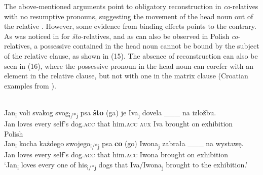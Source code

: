 \documentclass[output=paper]{langsci/langscibook}
\begin{document}
\ea%
    \label{ex:leska:14}
    \z
\z

The above-mentioned arguments point to obligatory reconstruction in \textit{co}-rel\-a\-tives with no resumptive pronouns, suggesting the movement of the head noun out of the relative \citep{Åfarli1994,Bhatt2002,Bianchi1999,Brame1968,Vries2002,Hornstein2000,Kayne1994,Safir1999,Schachter1973,Vergnaud1974,Zwart2000}. However, some evidence from binding effects points to the contrary. As was noticed in \citet{Gračanin-Yuksek2013} for  \textit{što}{}-relatives, and as can also be observed in Polish \textit{co}{}-relatives, a possessive  contained in the head noun cannot be bound by the subject of the relative clause, as shown in (15). The absence of reconstruction can also be seen in (16), where the possessive pronoun in the head noun can corefer with an element in the relative clause, but not with one in the matrix clause (Croatian examples from \citealt{Gračanin-Yuksek2013}).

\ea%
    \label{ex:leska:15}
    \ea    {}\\
      \gll Jan\textsubscript{i} voli   svakog   svog\textsubscript{i/*j} psa   \textbf{što} (ga)   je   Iva\textsubscript{j} dovela \_\_\_ na izložbu. \\
           Jan   loves   every   self’s   dog.\textsc{acc}  that  him.\textsc{acc}  \textsc{aux}  Iva   brought {} on exhibition  \\
      \ex   Polish\\
      \gll  Jan\textsubscript{i} kocha   każdego   swojego\textsubscript{i/*j} psa   \textbf{co}   (go)   Iwona\textsubscript{j}    zabrała \_\_\_   na wystawę.       \\
            Jan   loves   every   self’s   dog.\textsc{acc}   that  him.\textsc{acc}  Iwona    brought {}  on exhibition         \\
      \glt  ‘Jan\textsubscript{i} loves every one of his\textsubscript{i/*j} dogs that Iva\slash Iwona\textsubscript{j} brought to the exhibition.’   
    \z
\z
\end{document}
